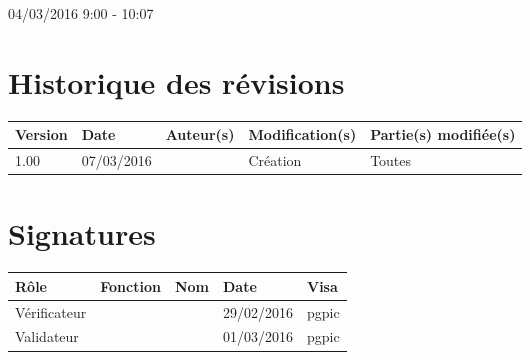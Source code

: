 \documentclass [a4paper] {article}
\begin{document}
04/03/2016			 				%
\hfill   
\hfill 	 9:00 - 10:07 				%


\section*{Historique des révisions}
\begin{center}
			\begin{tabular}{| p{2.5cm} | p{3cm} | p{3cm} | p{3cm} | p{3.5cm} |}
				\hline
				\rowcolor{Gray}
				Version & Date & Auteur(s) & Modification(s) & Partie(s) modifiée(s)		 \\
				\hline
				1.00 & 07/03/2016 & \Pierre & Création & Toutes \\
		\hline		
			\end{tabular}
		\end{center}

\section*{Signatures}

		\begin{center}
			\begin{tabular}{| p{2.5cm} | p{4cm} | p{3cm} | p{3cm} | p{2.5cm} |}
				\hline
				\rowcolor{Gray}
				Rôle & Fonction & Nom & Date & Visa		 \\
				\hline
				Vérificateur & \RQA & \Kafui & 29/02/2016 & pgpic \\[30pt]
				\hline
				Validateur & \CP & \Sergi & 01/03/2016 & pgpic \\[30pt]	
				\hline
			\end{tabular}
		\end{center}

\end{document}
